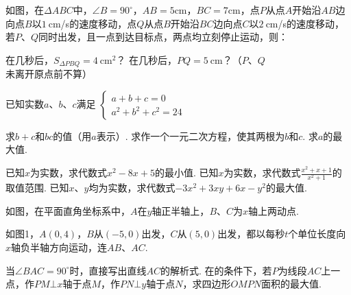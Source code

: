 \documentclass[10pt]{article}
\begin{document}
\begin{questions}{\answeringintroduction}
    \addspace{}
    \question 如图，在$\Delta ABC$中，$\angle B=90^{\circ}$，$AB=5$cm，$BC=7$cm，点$P$从点$A$开始沿$AB$边向点$B$以$1\ $cm/s的速度移动，点$Q$从点$B$开始沿$BC$边向点$C$以$2\ $cm/s的速度移动，若$P$、$Q$同时出发，且一点到达目标点，两点均立刻停止运动，则：
    \begin{subquestions}
        \subquestion 在几秒后，$S_{\Delta PBQ}=4\ $cm$^2$？
        \subquestion 在几秒后，$PQ=5\ $cm？（$P$、$Q$未离开原点前不算）
    \end{subquestions}
    \begin{figure}[!h]
        \raggedleft
    \end{figure}
    \question 已知实数$a$、$b$、$c$满足
    $\begin{cases}
        a + b + c = 0 \\
        a^2 + b^2 + c^2 = 24
    \end{cases}$
    \begin{subquestions}
        \subquestion 求$b+c$和$bc$的值（用$a$表示）.
        \subquestion 求作一个一元二次方程，使其两根为$b$和$c$.
        \subquestion 求$a$的最大值.
    \end{subquestions}
    \newpage
    \question
    \begin{subquestions}
        \subquestion 已知$x$为实数，求代数式$x^2-8x+5$的最小值.
        \subquestion 已知$x$为实数，求代数式${\frac{x^2+x+1}{x^2+1}}$的取值范围.
        \subquestion 已知$x$、$y$均为实数，求代数式$-3x^2+3xy+6x-y^2$的最大值.
    \end{subquestions}
    \addspace\addemptyline\addemptyline
    \question 如图，在平面直角坐标系中，$A$在$y$轴正半轴上，$B$、$C$为$x$轴上两动点.
    \begin{subquestions}
        \subquestion 如图1，$A(0,4)$，$B$从$(-5,0)$出发，$C$从$(5,0)$出发，都以每秒$t$个单位长度向$x$轴负半轴方向运动，连$AB$、$AC$.
        \begin{subsubquestions}
            \subsubquestion 当$\angle BAC=90^{\circ}$时，直接写出直线$AC$的解析式.
            \subsubquestion 在的条件下，若$P$为线段$AC$上一点，作$PM \bot x$轴于点$M$，作$PN \bot y$轴于点$N$，求四边形$OMPN$面积的最大值.

\end{subsubquestions}
\end{subquestions}
\end{questions}
\end{document}
